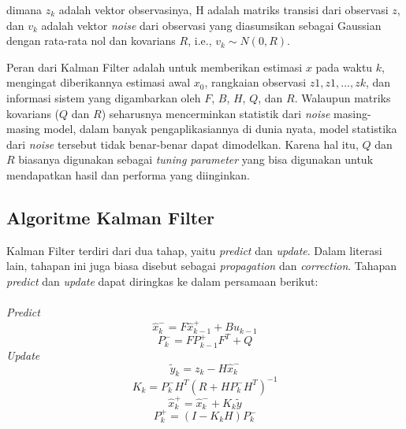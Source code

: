         dimana $z_k$ adalah vektor observasinya, H adalah matriks transisi dari observasi $z$, dan $v_{k}$ adalah vektor \textit{noise} dari observasi yang diasumsikan sebagai Gaussian dengan rata-rata nol dan kovarians $R$, i.e., $v_{k} \sim N(0, R)$.
        
        Peran dari Kalman Filter adalah untuk memberikan estimasi $x$ pada waktu $k$, mengingat diberikannya estimasi awal $x_0$, rangkaian observasi $z1, z1, ..., zk$, dan informasi sistem yang digambarkan oleh $F$, $B$, $H$, $Q$, dan $R$. Walaupun matriks kovarians ($Q$ dan $R$) seharusnya mencerminkan statistik dari \textit{noise} masing-masing model, dalam banyak pengaplikasiannya di dunia nyata, model statistika dari \textit{noise} tersebut tidak benar-benar dapat dimodelkan. Karena hal itu, $Q$ dan $R$ biasanya digunakan sebagai \textit{tuning parameter} yang bisa digunakan untuk mendapatkan hasil dan performa yang diinginkan.
    
    \subsection{Algoritme Kalman Filter}
        Kalman Filter terdiri dari dua tahap, yaitu \textit{predict} dan \textit{update}. Dalam literasi lain, tahapan ini juga biasa disebut sebagai \textit{propagation} dan \textit{correction}. Tahapan \textit{predict} dan \textit{update} dapat diringkas ke dalam persamaan berikut:\\\\
        
        \noindent\textit{Predict}
        \begin{equation}\label{eq:2.19}
        \hat{x}^-_k = F\hat{x}^+_{k-1} + Bu_{k-1}
        \end{equation}
        \begin{equation}\label{eq:2.20}
        P^-_k = FP^+_{k-1}F^T + Q
        \end{equation}
        \textit{Update}
        \begin{equation}\label{eq:2.21}
        \tilde{y}_k = z_k - H\hat{x}^-_k
        \end{equation}
        \begin{equation}\label{eq:2.22}
        K_k = P^-_kH^T(R + HP^-_kH^T)^{-1}
        \end{equation}
        \begin{equation}\label{eq:2.23}
        \hat{x}^+_k = \hat{x}^-_k + K_k\tilde{y}
        \end{equation}
        \begin{equation}\label{eq:2.24}
        P^+_k = (I - K_kH)P^-_k
        \end{equation}
        
